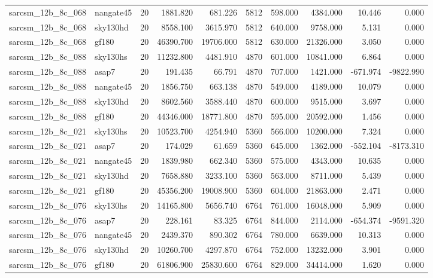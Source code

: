 \begin{longtable}{llrrrrrrrr}
sarcsm\_12b\_8c\_068 & nangate45 & 20 & 1881.820 & 681.226 & 5812 & 598.000 & 4384.000 & 10.446 & 0.000 \\
sarcsm\_12b\_8c\_068 & sky130hd & 20 & 8558.100 & 3615.970 & 5812 & 640.000 & 9758.000 & 5.131 & 0.000 \\
sarcsm\_12b\_8c\_068 & gf180 & 20 & 46390.700 & 19706.000 & 5812 & 630.000 & 21326.000 & 3.050 & 0.000 \\
sarcsm\_12b\_8c\_088 & sky130hs & 20 & 11232.800 & 4481.910 & 4870 & 601.000 & 10841.000 & 6.864 & 0.000 \\
sarcsm\_12b\_8c\_088 & asap7 & 20 & 191.435 & 66.791 & 4870 & 707.000 & 1421.000 & -671.974 & -9822.990 \\
sarcsm\_12b\_8c\_088 & nangate45 & 20 & 1856.750 & 663.138 & 4870 & 549.000 & 4189.000 & 10.079 & 0.000 \\
sarcsm\_12b\_8c\_088 & sky130hd & 20 & 8602.560 & 3588.440 & 4870 & 600.000 & 9515.000 & 3.697 & 0.000 \\
sarcsm\_12b\_8c\_088 & gf180 & 20 & 44346.000 & 18771.800 & 4870 & 595.000 & 20592.000 & 1.456 & 0.000 \\
sarcsm\_12b\_8c\_021 & sky130hs & 20 & 10523.700 & 4254.940 & 5360 & 566.000 & 10200.000 & 7.324 & 0.000 \\
sarcsm\_12b\_8c\_021 & asap7 & 20 & 174.029 & 61.659 & 5360 & 645.000 & 1362.000 & -552.104 & -8173.310 \\
sarcsm\_12b\_8c\_021 & nangate45 & 20 & 1839.980 & 662.340 & 5360 & 575.000 & 4343.000 & 10.635 & 0.000 \\
sarcsm\_12b\_8c\_021 & sky130hd & 20 & 7658.880 & 3233.100 & 5360 & 563.000 & 8711.000 & 5.439 & 0.000 \\
sarcsm\_12b\_8c\_021 & gf180 & 20 & 45356.200 & 19008.900 & 5360 & 604.000 & 21863.000 & 2.471 & 0.000 \\
sarcsm\_12b\_8c\_076 & sky130hs & 20 & 14165.800 & 5656.740 & 6764 & 761.000 & 16048.000 & 5.909 & 0.000 \\
sarcsm\_12b\_8c\_076 & asap7 & 20 & 228.161 & 83.325 & 6764 & 844.000 & 2114.000 & -654.374 & -9591.320 \\
sarcsm\_12b\_8c\_076 & nangate45 & 20 & 2439.370 & 890.302 & 6764 & 780.000 & 6639.000 & 10.313 & 0.000 \\
sarcsm\_12b\_8c\_076 & sky130hd & 20 & 10260.700 & 4297.870 & 6764 & 752.000 & 13232.000 & 3.901 & 0.000 \\
sarcsm\_12b\_8c\_076 & gf180 & 20 & 61806.900 & 25830.600 & 6764 & 829.000 & 34414.000 & 1.620 & 0.000 \\

\end{longtable}
